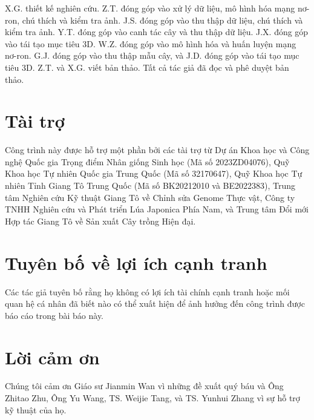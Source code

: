 \documentclass[12pt, a4paper]{article}
\begin{document}
X.G. thiết kế nghiên cứu. Z.T. đóng góp vào xử lý dữ liệu, mô hình hóa mạng nơ-ron, chú
thích và kiểm tra ảnh. J.S. đóng góp vào thu thập dữ liệu, chú thích và kiểm tra ảnh. Y.T.
đóng góp vào canh tác cây và thu thập dữ liệu. J.X. đóng góp vào tái tạo mục tiêu 3D. W.Z.
đóng góp vào mô hình hóa và huấn luyện mạng nơ-ron. G.J. đóng góp vào thu thập mẫu cây, và
J.D. đóng góp vào tái tạo mục tiêu 3D. Z.T. và X.G. viết bản thảo. Tất cả tác giả đã đọc và
phê duyệt bản thảo.

\section*{Tài trợ}

Công trình này được hỗ trợ một phần bởi các tài trợ từ Dự án Khoa học và Công nghệ Quốc gia
Trọng điểm Nhân giống Sinh học (Mã số 2023ZD04076), Quỹ Khoa học Tự nhiên Quốc gia Trung
Quốc (Mã số 32170647), Quỹ Khoa học Tự nhiên Tỉnh Giang Tô Trung Quốc (Mã số BK20212010 và
BE2022383), Trung tâm Nghiên cứu Kỹ thuật Giang Tô về Chỉnh sửa Genome Thực vật, Công ty
TNHH Nghiên cứu và Phát triển Lúa Japonica Phía Nam, và Trung tâm Đổi mới Hợp tác Giang Tô
về Sản xuất Cây trồng Hiện đại.

\section*{Tuyên bố về lợi ích cạnh tranh}

Các tác giả tuyên bố rằng họ không có lợi ích tài chính cạnh tranh hoặc mối quan hệ cá nhân
đã biết nào có thể xuất hiện để ảnh hưởng đến công trình được báo cáo trong bài báo này.

\section*{Lời cảm ơn}

Chúng tôi cảm ơn Giáo sư Jianmin Wan vì những đề xuất quý báu và Ông Zhitao Zhu, Ông Yu
Wang, TS. Weijie Tang, và TS. Yunhui Zhang vì sự hỗ trợ kỹ thuật của họ.
\end{document}
